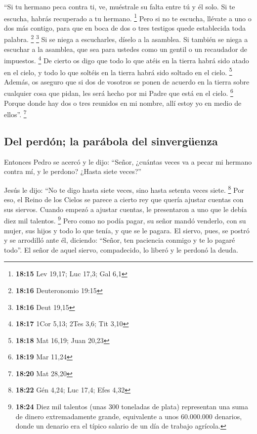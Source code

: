  ``Si tu hermano peca contra ti, ve, muéstrale su falta
entre tú y él solo. Si te escucha, habrás recuperado a tu hermano.
\footnote{\textbf{18:15} Lev 19,17; Luc 17,3; Gal 6,1} 
Pero si no te escucha, llévate a uno o dos más contigo, para que en boca
de dos o tres testigos quede establecida toda palabra. \footnote{\textbf{18:16}
  Deuteronomio 19:15} \footnote{\textbf{18:16} Deut 19,15}
 Si se niega a escucharles, díselo a la asamblea. Si
también se niega a escuchar a la asamblea, que sea para ustedes como un
gentil o un recaudador de impuestos. \footnote{\textbf{18:17} 1Cor 5,13;
  2Tes 3,6; Tit 3,10}  De cierto os digo que todo lo que
atéis en la tierra habrá sido atado en el cielo, y todo lo que soltéis
en la tierra habrá sido soltado en el cielo. \footnote{\textbf{18:18}
  Mat 16,19; Juan 20,23}  Además, os aseguro que si dos
de vosotros se ponen de acuerdo en la tierra sobre cualquier cosa que
pidan, les será hecho por mi Padre que está en el cielo. \footnote{\textbf{18:19}
  Mar 11,24}  Porque donde hay dos o tres reunidos en mi
nombre, allí estoy yo en medio de ellos''. \footnote{\textbf{18:20} Mat
  28,20}

\hypertarget{del-perduxf3n-la-paruxe1bola-del-sinverguxfcenza}{%
\subsection{Del perdón; la parábola del
sinvergüenza}\label{del-perduxf3n-la-paruxe1bola-del-sinverguxfcenza}}

 Entonces Pedro se acercó y le dijo: ``Señor, ¿cuántas
veces va a pecar mi hermano contra mí, y le perdono? ¿Hasta siete
veces?''

 Jesús le dijo: ``No te digo hasta siete veces, sino
hasta setenta veces siete. \footnote{\textbf{18:22} Gén 4,24; Luc 17,4;
  Efes 4,32}  Por eso, el Reino de los Cielos se parece a
cierto rey que quería ajustar cuentas con sus siervos. 
Cuando empezó a ajustar cuentas, le presentaron a uno que le debía diez
mil talentos. \footnote{\textbf{18:24} Diez mil talentos (unas 300
  toneladas de plata) representan una suma de dinero extremadamente
  grande, equivalente a unos 60.000.000 denarios, donde un denario era
  el típico salario de un día de trabajo agrícola.}  Pero
como no podía pagar, su señor mandó venderlo, con su mujer, sus hijos y
todo lo que tenía, y que se le pagara.  El siervo, pues,
se postró y se arrodilló ante él, diciendo: ``Señor, ten paciencia
conmigo y te lo pagaré todo''.  El señor de aquel siervo,
compadecido, lo liberó y le perdonó la deuda.

